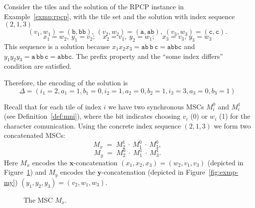 \begin{example}\label{exm:teo}
Consider the tiles and the solution of the RPCP instance 
in Example~\ref{exmp:rpcp}, with the tile set and the solution
with index sequence $(2,1,3)$
$$
 (v_1,w_1)=(\texttt{b},\texttt{bb}),\ 
 (v_2,w_2)=(\texttt{a},\texttt{ab}),\ 
 (v_3,w_3)=(\texttt{c},\texttt{c}).
$$
$$
 x_1=w_2,\ y_1=v_2;\quad x_2=v_1,\ y_2=w_1;\quad x_3=v_3,\ y_3=w_3
$$
This sequence is a solution because
$x_1x_2x_3=\texttt{ab}\,\texttt{b}\,\texttt{c}=\texttt{abbc}$ and
$y_1y_2y_3=\texttt{a}\,\texttt{bb}\,\texttt{c}=\texttt{abbc}$. The
prefix property and the ``some index differs'' condition are satisfied.

Therefore, the encoding of the solution is
$$\Delta = (i_1=2,a_1=1,b_1=0,i_2=1,a_2=0,b_2=1,i_3=3,a_3=0,b_3=1)$$

Recall that for each tile of index \(i\) we have two synchronous MSCs
\(M_i^0\) and \(M_i^1\) (see Definition~\ref{def:mni}), where the bit
indicates choosing \(v_i\) (0) or \(w_i\) (1) for the character comunication.
Using the concrete index sequence \((2,1,3)\) we form two
concatenated MSCs:
\[
  M_x\;=\; M^{1}_{2}\ \cdot\ M^{0}_{1}\ \cdot\ M^{0}_{3},
\]
\[
  M_y\;=\; M^{0}_{2}\ \cdot\ M^{1}_{1}\ \cdot\ M^{1}_{3}.
\]
Here \(M_x\) encodes the \(\mathbf{x}\)-concatenation
\((x_1,x_2,x_3)=(w_2,v_1,v_3)\) (depicted 
in Figure~\ref{fig:exmp-mx}) and \(M_y\) encodes 
the \(\mathbf{y}\)-concatenation (depicted in 
Figure~\ref{fig:exmp-my}) \((y_1,y_2,y_3)=(v_2,w_1,w_3)\).

\begin{figure}[!ht]
\centering
\begin{msc}[draw frame=none, draw head=none, msc keyword=, head height=0px, label distance=0.5ex, foot height=0px, foot distance=0px]{}
	\declinst{P2}{P2}{}



\end{msc}
\caption{The MSC $M_x$.}
\label{fig:exmp-mx}
\end{figure}


\end{example}
